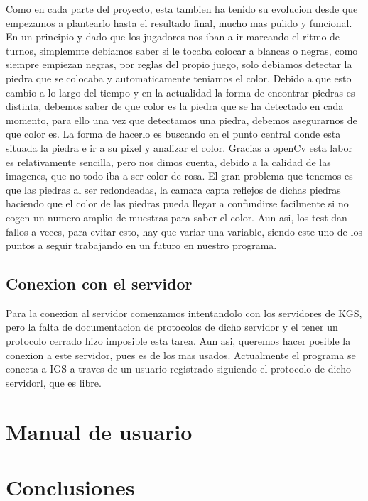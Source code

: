 \documentclass[12pt,a4paper]{report}
\begin{document}
Como en cada parte del proyecto, esta tambien ha tenido su evolucion desde que empezamos a plantearlo hasta el resultado final, mucho mas pulido y funcional. En un principio y dado que los jugadores nos iban a ir marcando el ritmo de turnos, simplemnte debiamos saber si le tocaba colocar a blancas o negras, como siempre empiezan negras, por reglas del propio juego, solo debiamos detectar la piedra que se colocaba y automaticamente teniamos el color.
Debido a que esto cambio a lo largo del tiempo y en la actualidad la forma de encontrar piedras es distinta, debemos saber de que color es la piedra que se ha detectado en cada momento, para ello una vez que detectamos una piedra, debemos asegurarnos de que color es. La forma de hacerlo es buscando en el punto central donde esta situada la piedra e ir a su pixel y analizar el color. Gracias a openCv esta labor es relativamente sencilla, pero nos dimos cuenta, debido a la calidad de las imagenes, que no todo iba a ser color de rosa. El gran problema que tenemos es que las piedras al ser redondeadas, la camara capta reflejos de dichas piedras haciendo que el color de las piedras pueda llegar a confundirse facilmente si no cogen un numero amplio de muestras para saber el color. Aun asi, los test dan fallos a veces, para evitar esto, hay que variar una variable, siendo este uno de los puntos a seguir trabajando en un futuro en nuestro programa.

\section{Conexion con el servidor}

Para la conexion al servidor comenzamos intentandolo con los servidores de KGS, pero la falta de documentacion de protocolos de dicho servidor y el tener un protocolo cerrado hizo imposible esta tarea. Aun asi, queremos hacer posible la conexion a este servidor, pues es de los mas usados. Actualmente el programa se conecta a IGS a traves de un usuario registrado siguiendo el protocolo de dicho servidorl, que es libre.


 
\chapter{Manual de usuario}



\chapter{Conclusiones}
\end{document}

